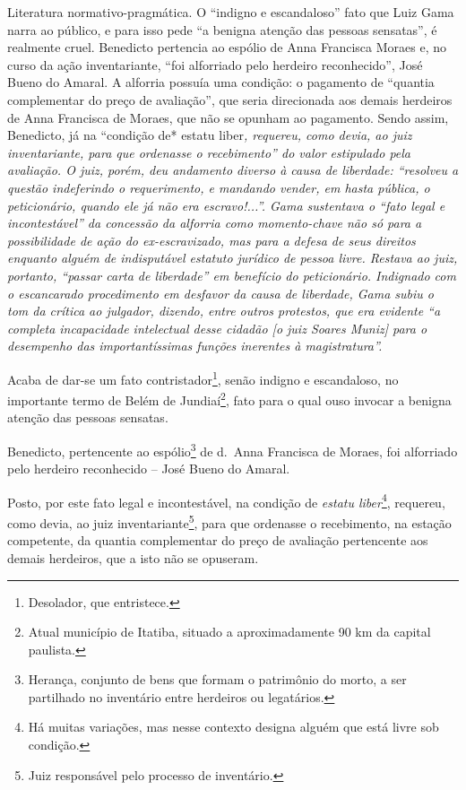 \begin{didascalia}
Literatura normativo-pragmática. O ``indigno e escandaloso'' fato que Luiz
Gama narra ao público, e para isso pede ``a benigna atenção das pessoas
sensatas'', é realmente cruel. Benedicto pertencia ao espólio de Anna
Francisca Moraes e, no curso da ação inventariante, ``foi alforriado pelo
herdeiro reconhecido'', José Bueno do Amaral. A alforria possuía uma
condição: o pagamento de ``quantia complementar do preço de avaliação'',
que seria direcionada aos demais herdeiros de Anna Francisca de Moraes,
que não se opunham ao pagamento. Sendo assim, Benedicto, já na ``condição
de* estatu liber\emph{, requereu, como devia, ao juiz inventariante,
para que ordenasse o recebimento'' do valor estipulado pela avaliação. O
juiz, porém, deu andamento diverso à causa de liberdade: ``resolveu a
questão indeferindo o requerimento, e mandando vender, em hasta pública,
o peticionário, quando ele já não era escravo!...''. Gama sustentava o
``fato legal e incontestável'' da concessão da alforria como momento-chave
não só para a possibilidade de ação do ex-escravizado, mas para a defesa
de seus direitos enquanto alguém de indisputável estatuto jurídico de
pessoa livre. Restava ao juiz, portanto, ``passar carta de liberdade'' em
benefício do peticionário. Indignado com o escancarado procedimento em
desfavor da causa de liberdade, Gama subiu o tom da crítica ao julgador,
dizendo, entre outros protestos, que era evidente ``a completa
incapacidade intelectual desse cidadão {[}o juiz Soares Muniz{]} para o
desempenho das importantíssimas funções inerentes à magistratura''.}
\end{didascalia}

\asterisc{}

Acaba de dar-se um fato contristador\footnote{Desolador, que
  entristece.}, senão indigno e escandaloso, no importante termo de
Belém de Jundiaí\footnote{Atual município de Itatiba, situado a
  aproximadamente 90 km da capital paulista.}, fato para o qual ouso
invocar a benigna atenção das pessoas sensatas.

Benedicto, pertencente ao espólio\footnote{Herança, conjunto de bens
  que formam o patrimônio do morto, a ser partilhado no inventário entre
  herdeiros ou legatários.} de d.~Anna Francisca de Moraes, foi
alforriado pelo herdeiro reconhecido -- José Bueno do Amaral.

Posto, por este fato legal e incontestável, na condição de \emph{estatu
liber}\footnote{Há muitas variações, mas nesse contexto designa alguém
  que está livre sob condição.}, requereu, como devia, ao juiz
inventariante\footnote{Juiz responsável pelo processo de inventário.},
para que ordenasse o recebimento, na estação competente, da quantia
complementar do preço de avaliação pertencente aos demais herdeiros, que
a isto não se opuseram.

